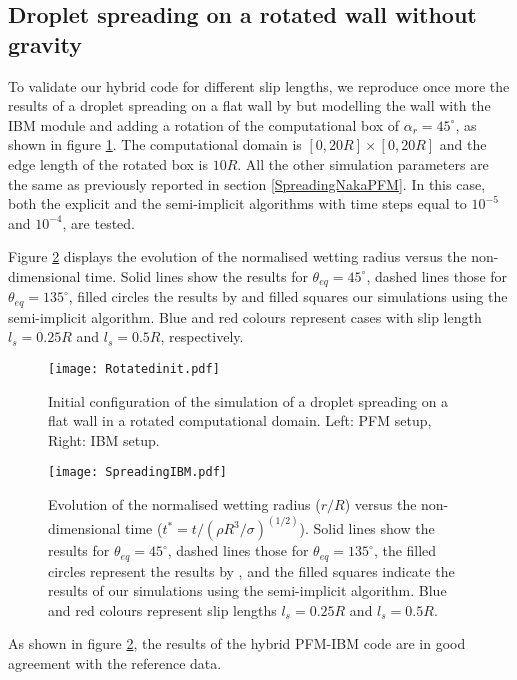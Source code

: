 \documentclass[review]{elsarticle}
\begin{document}
\subsection{Droplet spreading on a rotated wall without gravity}
To validate our hybrid code for different slip lengths, we reproduce once more the results of a droplet spreading on a flat wall by \cite{Nakamura2013} but modelling the wall with the IBM module and adding a rotation of the computational box  of $\alpha_r=45^\circ$, as shown in figure \ref{fig:DropletRot}. The computational domain is $[0,20R] \times [0,20R]$ and the edge length of the rotated box is $10R$. All the other simulation parameters are the same as previously reported in section \ref{SpreadingNakaPFM}. In this case, both the explicit and the semi-implicit algorithms with time steps equal to $10^{-5}$ and $10^{-4}$, are tested.

Figure \ref{fig:WettingRadius} displays the evolution of the normalised wetting radius versus the non-dimensional time. Solid lines show the results for $\theta_{eq}=45^\circ$, dashed lines those for $\theta_{eq}=135^\circ$, filled circles the results by \cite{Nakamura2013} and filled squares  our simulations using the semi-implicit algorithm. Blue and red colours represent cases with slip length $l_s=0.25R$ and $l_s=0.5R$, respectively. 

\begin{figure} [H]
\centering
\texttt{[image: Rotatedinit.pdf]}
\caption{Initial configuration of the simulation of a droplet spreading on a flat wall in a rotated computational domain. Left: PFM setup, Right: IBM setup. }
\label{fig:DropletRot}
\end{figure}

\begin{figure} [H]
\centering
\texttt{[image: SpreadingIBM.pdf]}
\caption{Evolution of the normalised wetting radius ($r/R$) versus the non-dimensional time ($t^*=t/{(\rho R^3/ \sigma)}^{(1/2)}$). Solid lines show the results for $\theta_{eq}=45^\circ$, dashed lines those for  $\theta_{eq}=135^\circ$, the filled circles represent the results by \cite{Nakamura2013}, and the filled squares indicate the results of our simulations using the semi-implicit algorithm. Blue and red colours represent slip lengths $l_s=0.25R$ and $l_s=0.5R$.}
\label{fig:WettingRadius}
\end{figure}
As shown in figure \ref{fig:WettingRadius}, the results of the hybrid PFM-IBM code are in good agreement with the reference data.
\end{document}
